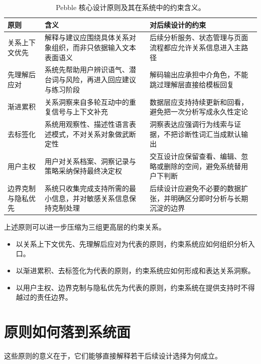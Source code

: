 \begin{table}[H]
  \centering
  \caption{Pebble 核心设计原则及其在系统中的约束含义。}
  \label{tab:pebble-core-principles}
  \begin{tabularx}{\textwidth}{>{\raggedright\arraybackslash}p{2.8cm} >{\raggedright\arraybackslash}X >{\raggedright\arraybackslash}X}
    \toprule
    原则 & 含义 & 对后续设计的约束 \\
    \midrule
    关系上下文优先 & 解释与建议应围绕具体关系对象组织，而非只依据输入文本表面语义 & 后续分析服务、状态管理与页面流程都应允许关系信息进入主路径 \\
    先理解后应对 & 系统先帮助用户辨识语气、潜台词与风险，再进入回应建议与练习阶段 & 解码输出应承担中介角色，不能跳过理解层直接给模板回复 \\
    渐进累积 & 关系洞察来自多轮互动中的重复信号与上下文补充 & 数据层应支持持续更新和回看，避免把一次分析写成永久性定论 \\
    去标签化 & 系统用观察性、描述性语言表述模式，不对关系对象做武断定性 & 洞察表达应强调行为线索与证据，不把诊断性词汇当成默认输出 \\
    用户主权 & 用户对关系档案、洞察记录与策略采纳保持最终决定权 & 交互设计应保留查看、编辑、忽略或删除的空间，避免系统替用户下判断 \\
    边界克制与隐私优先 & 系统只收集完成支持所需的最小信息，并对敏感关系信息保持克制处理 & 后续设计应避免不必要的数据扩张，并明确区分即时分析与长期沉淀的边界 \\
    \bottomrule
  \end{tabularx}
\end{table}

上述原则可以进一步压缩为三组更高层的约束关系。

\begin{itemize}
  \item 以关系上下文优先、先理解后应对为代表的原则，约束系统应如何组织分析入口。
  \item 以渐进累积、去标签化为代表的原则，约束系统应如何形成和表达关系洞察。
  \item 以用户主权、边界克制与隐私优先为代表的原则，约束系统在提供支持时不得越过的责任边界。
\end{itemize}

\section{原则如何落到系统面}

这些原则的意义在于，它们能够直接解释若干后续设计选择为何成立。


